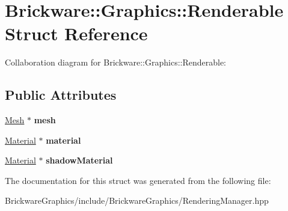 \hypertarget{structBrickware_1_1Graphics_1_1Renderable}{}\section{Brickware\+:\+:Graphics\+:\+:Renderable Struct Reference}
\label{structBrickware_1_1Graphics_1_1Renderable}


Collaboration diagram for Brickware\+:\+:Graphics\+:\+:Renderable\+:
\subsection*{Public Attributes}
\begin{DoxyCompactItemize}
\item 
\hypertarget{structBrickware_1_1Graphics_1_1Renderable_a17280d7c1b866352fb2c1c5ea93b25b8}{}\hyperlink{classBrickware_1_1Graphics_1_1Mesh}{Mesh} $\ast$ {\bfseries mesh}\label{structBrickware_1_1Graphics_1_1Renderable_a17280d7c1b866352fb2c1c5ea93b25b8}

\item 
\hypertarget{structBrickware_1_1Graphics_1_1Renderable_a796292d7178263992aae84acc7d605b4}{}\hyperlink{classBrickware_1_1Graphics_1_1Material}{Material} $\ast$ {\bfseries material}\label{structBrickware_1_1Graphics_1_1Renderable_a796292d7178263992aae84acc7d605b4}

\item 
\hypertarget{structBrickware_1_1Graphics_1_1Renderable_a1bdaec79ec8255689d10c46e5f04e2ff}{}\hyperlink{classBrickware_1_1Graphics_1_1Material}{Material} $\ast$ {\bfseries shadow\+Material}\label{structBrickware_1_1Graphics_1_1Renderable_a1bdaec79ec8255689d10c46e5f04e2ff}

\end{DoxyCompactItemize}


The documentation for this struct was generated from the following file\+:\begin{DoxyCompactItemize}
\item 
Brickware\+Graphics/include/\+Brickware\+Graphics/Rendering\+Manager.\+hpp\end{DoxyCompactItemize}
